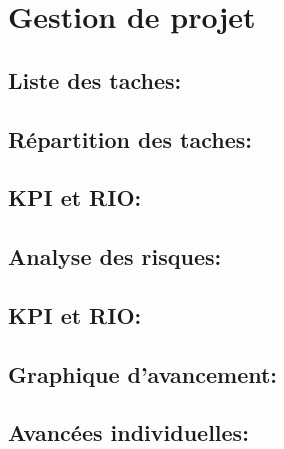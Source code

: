 \documentclass[11pt]{article}
\begin{document}
\section{\textcolor{section}{Gestion de projet\\}}
\subsection*{\textcolor{sub_section}{Liste des taches:}}
\subsection*{\textcolor{sub_section}{Répartition des taches:}}
\subsection*{\textcolor{sub_section}{KPI et RIO:}}
\subsection*{\textcolor{sub_section}{Analyse des risques:}}
\subsection*{\textcolor{sub_section}{KPI et RIO:}}
\subsection*{\textcolor{sub_section}{Graphique d'avancement:}}
\subsection*{\textcolor{sub_section}{Avancées individuelles:}}
\end{document}
